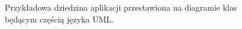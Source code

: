 \begin{figure}[!ht]
\begin{center}
\end{center}

\caption{Przykładowa dziedzina aplikacji przestawiona na diagramie klas będącym częścią języka UML.}
\label{fig:implementation_core:uml}
\end{figure}
